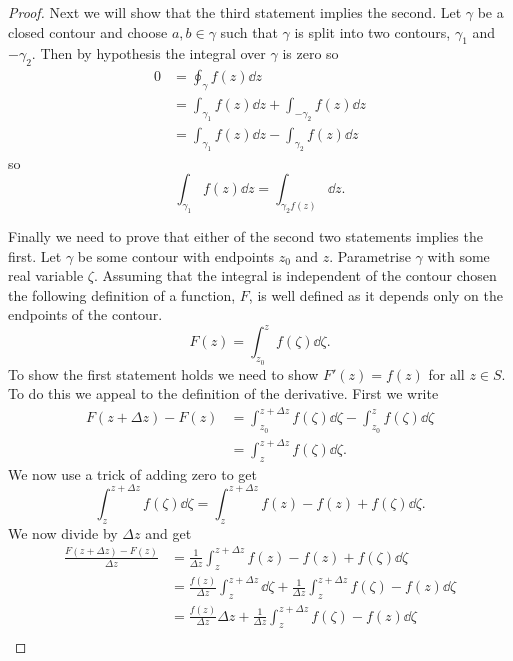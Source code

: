 \documentclass{article}
\begin{document}
\begin{proof}
        Next we will show that the third statement implies the second.
        Let \(\gamma\) be a closed contour and choose \(a, b\in\gamma\) such that \(\gamma\) is split into two contours, \(\gamma_1\) and \(-\gamma_2\).
        Then by hypothesis the integral over \(\gamma\) is zero so
        \begin{align*}
            0 &= \oint_{\gamma} f(z)\dd{z}\\
            &= \int_{\gamma_1} f(z) \dd{z} + \int_{-\gamma_2} f(z)\dd{z}\\
            &= \int_{\gamma_1} f(z) \dd{z} - \int_{\gamma_2} f(z)\dd{z}
        \end{align*}
        so
        \[\int_{\gamma_1} f(z)\dd{z} = \int_{\gamma_2 f(z)}\dd{z}.\]
        
        Finally we need to prove that either of the second two statements implies the first.
        Let \(\gamma\) be some contour with endpoints \(z_0\) and \(z\).
        Parametrise \(\gamma\) with some real variable \(\zeta\).
        Assuming that the integral is independent of the contour chosen the following definition of a function, \(F\), is well defined as it depends only on the endpoints of the contour.
        \[F(z) = \int_{z_0}^{z} f(\zeta) \dd{\zeta}.\]
        To show the first statement holds we need to show \(F'(z) = f(z)\) for all \(z\in S\).
        To do this we appeal to the definition of the derivative.
        First we write
        \begin{align*}
            F(z + \Delta z) - F(z) &= \int_{z_0}^{z + \Delta z} f(\zeta)\dd{\zeta} - \int_{z_0}^{z} f(\zeta)\dd{\zeta}\\
            &= \int_{z}^{z + \Delta z} f(\zeta)\dd{\zeta}.
        \end{align*}
        We now use a trick of adding zero to get
        \[\int_{z}^{z + \Delta z} f(\zeta)\dd{\zeta} = \int_z^{z + \Delta z} f(z) - f(z) + f(\zeta)\dd{\zeta}.\]
        We now divide by \(\Delta z\) and get
        \begin{align*}
            \frac{F(z + \Delta z) - F(z)}{\Delta z} &= \frac{1}{\Delta z} \int_{z}^{z + \Delta z} f(z) - f(z) + f(\zeta)\dd{\zeta}\\
            &= \frac{f(z)}{\Delta z}\int_{z}^{z + \Delta z}\dd{\zeta} + \frac{1}{\Delta z} \int_{z}^{z + \Delta z} f(\zeta) - f(z)\dd{\zeta}\\
            &= \frac{f(z)}{\Delta z}\Delta z + \frac{1}{\Delta z} \int_{z}^{z + \Delta z} f(\zeta) - f(z)\dd{\zeta}\\

\end{align*}
\end{proof}
\end{document}
